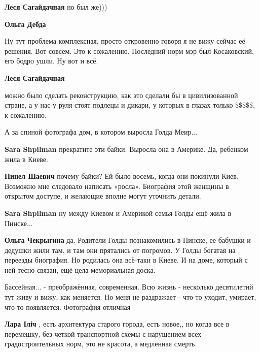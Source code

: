\begin{itemize}
\begin{itemize}
\begin{itemize}
\textbf{Леся Сагайдачная} но был же)))

\textbf{Ольга Дебда} 

Ну тут проблема комплексная, просто откровенно говоря я не вижу сейчас её
решения. Вот совсем. Это к сожалению. Последний норм мэр был Косаковский, его
бодро ушли. Ну вот и всё.

 \textbf{Леся Сагайдачная} 

можно было сделать реконструкцию, как это сделали бы в цивилизованной стране, а
у нас у руля стоят подлецы и дикари, у которых в глазах только \$\$\$\$\$, к
сожалению.

\end{itemize} %

\end{itemize} %

А за спиной фотографа дом, в котором выросла Голда Меир...

\begin{itemize} %
\textbf{Sara Shpilman} прекратите эти байки. Выросла она в Америке. Да, ребенком жила в Киеве.

\begin{itemize} %
\textbf{Нинел Шаевич} почему байки? Ей было восемь, когда они покинули Киев. Возможно мне следовало написать «росла». Биография этой женщины в открытом доступе, и желающие вполне могут уточнить детали.

\textbf{Sara Shpilman} ну между Киевом и Америкой семья Голды ещё жила в Пинске...

\textbf{Ольга Чекрыгина} да. Родители Голды познакомились в Пинске, ее бабушки и дедушки жили там, и там они прятались от погромов. У Голды богатая на переезды биография. Но родилась она всё-таки в Киеве. И на доме, который с ней тесно связан, ещё цела мемориальная доска.
\end{itemize} %

\end{itemize} %


Бассейная... - преображённая, современная. Всю жизнь - несколько десятилетий
тут живу и вижу, как меняется. Но меня не раздражает - что-то уходит, умирает,
что-то появляется. Фотография отличная

\begin{itemize} %
\textbf{Лара Іліч} , есть архитектура старого города, есть новое,, но когда все в перемешку, без четкой транспортной схемы с нарушением всех градостроительных норм, это не красота, а медленная смерть


\end{itemize}
\end{itemize}

